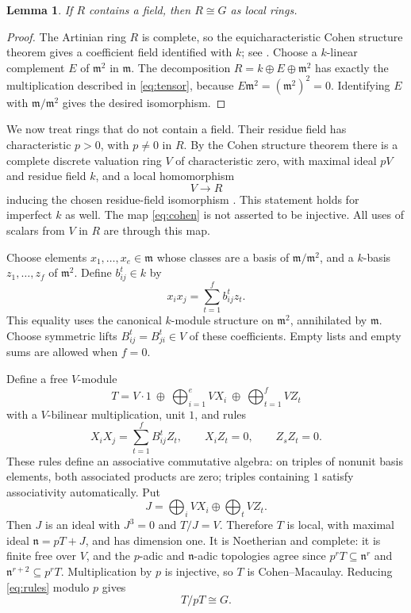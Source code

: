 \documentclass[11pt]{article}
\newtheorem{lemma}[theorem]{Lemma}
\theoremstyle{remark}\newtheorem{remark}[theorem]{Remark}
\newcommand{\m}{\mathfrak m}
\newcommand{\n}{\mathfrak n}
\begin{document}
\begin{lemma}\label{lem:field}
If $R$ contains a field, then $R\cong G$ as local rings.
\end{lemma}
\begin{proof}
The Artinian ring $R$ is complete, so the equicharacteristic Cohen structure theorem gives a coefficient field identified with $k$; see \cite[Tag 032A]{Stacks}. Choose a $k$-linear complement $E$ of $\m^2$ in $\m$. The decomposition $R=k\oplus E\oplus\m^2$ has exactly the multiplication described in \eqref{eq:tensor}, because $E\m^2=(\m^2)^2=0$. Identifying $E$ with $\m/\m^2$ gives the desired isomorphism.
\end{proof}

We now treat rings that do not contain a field. Their residue field has characteristic $p>0$, with $p\ne0$ in $R$. By the Cohen structure theorem there is a complete discrete valuation ring $V$ of characteristic zero, with maximal ideal $pV$ and residue field $k$, and a local homomorphism
\begin{equation}\label{eq:cohen}
 V\longrightarrow R
\end{equation}
inducing the chosen residue-field isomorphism \cite[Tag 032A and its proof]{Stacks}. This statement holds for imperfect $k$ as well. The map \eqref{eq:cohen} is not asserted to be injective. All uses of scalars from $V$ in $R$ are through this map.

Choose elements $x_1,\ldots,x_e\in\m$ whose classes are a basis of $\m/\m^2$, and a $k$-basis $z_1,\ldots,z_f$ of $\m^2$. Define $b_{ij}^t\in k$ by
\[
 x_ix_j=\sum_{t=1}^f b_{ij}^t z_t.
\]
This equality uses the canonical $k$-module structure on $\m^2$, annihilated by $\m$. Choose symmetric lifts $B_{ij}^t=B_{ji}^t\in V$ of these coefficients. Empty lists and empty sums are allowed when $f=0$.

Define a free $V$-module
\begin{equation}\label{eq:algebra}
 T=V\cdot1\ \oplus\ \bigoplus_{i=1}^e VX_i\ \oplus\ \bigoplus_{t=1}^f VZ_t
\end{equation}
with a $V$-bilinear multiplication, unit $1$, and rules
\begin{equation}\label{eq:rules}
 X_iX_j=\sum_{t=1}^f B_{ij}^t Z_t,\qquad X_iZ_t=0,\qquad Z_sZ_t=0.
\end{equation}
These rules define an associative commutative algebra: on triples of nonunit basis elements, both associated products are zero; triples containing $1$ satisfy associativity automatically. Put
\[
 J=\bigoplus_i VX_i\oplus\bigoplus_t VZ_t.
\]
Then $J$ is an ideal with $J^3=0$ and $T/J=V$. Therefore $T$ is local, with maximal ideal $\n=pT+J$, and has dimension one. It is Noetherian and complete: it is finite free over $V$, and the $p$-adic and $\n$-adic topologies agree since $p^rT\subseteq\n^r$ and $\n^{r+2}\subseteq p^rT$. Multiplication by $p$ is injective, so $T$ is Cohen--Macaulay. Reducing \eqref{eq:rules} modulo $p$ gives
\begin{equation}\label{eq:fiber}
 T/pT\cong G.
\end{equation}
\end{document}
